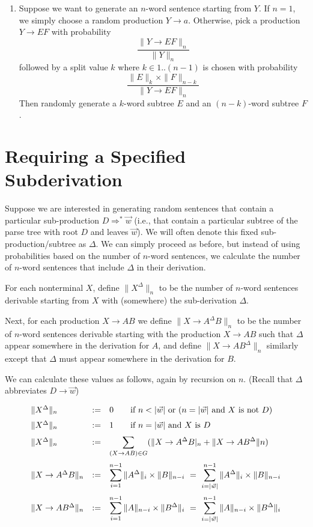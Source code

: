\documentclass[12pt]{article}
\begin{document}
\begin{enumerate}
    \item Suppose we want to generate an $n$-word sentence starting from $Y$.
    If $n = 1$, we simply choose a random production $Y \to a$. Otherwise,
    pick a production $Y\to EF$ with probability
    \[\frac{\|Y \to EF\|_n}{\|Y\|_n} \]
    followed by a split value $k$ where $k\in{1..(n-1)}$ is chosen with probability
    \[
      \frac{\|E\|_k\times\|F\|_{n{-}k}}{\|Y\to EF\|_n}
    \]
    Then randomly generate a $k$-word subtree $E$ and an $(n{-}k)$-word subtree $F$.
\end{enumerate}

\section{Requiring a Specified Subderivation}

Suppose we are interested in generating random sentences that contain a particular sub-production $D \Rightarrow^* \vec{w}$ (i.e., that contain a particular subtree of the parse tree with root $D$ and leaves $\vec{w}$). We will often denote this fixed sub-production/subtree as $\Delta$.
We can simply proceed as before, but instead of using probabilities based on  the number of $n$-word sentences, we calculate the number of $n$-word sentences that include $\Delta$ in their derivation.

For each nonterminal $X$, define $\|X^\Delta\|_n$ to be the number of $n$-word sentences derivable starting from $X$ with (somewhere) the sub-derivation $\Delta$.

Next, for each production $X\to AB$ we define $\|X\to A^\Delta B\|_n$ to be the number of $n$-word sentences derivable starting with the production $X\to AB$ such that $\Delta$ appear somewhere in the derivation for $A$, and define
$\|X\to AB^\Delta\|_n$ similarly except that $\Delta$ must appear somewhere in the derivation for $B$.

We can calculate these values as follows, again by recursion on $n$. (Recall that $\Delta$ abbreviates $D\to \vec{w}$)

\[
    \begin{array}{lcl}
    \|X^\Delta\|_n &:=&0 \qquad \mbox{if $n < |\vec{w}|$ or ($n = |\vec{w}|$ and $X$ is not $D$)}\\
    \noalign{\medskip}
    \|X^\Delta\|_n &:=& 1 \qquad \mbox{if $n = |\vec{w}|$ and $X$ is $D$}\\
    \noalign{\medskip}
    \|X^\Delta\|_n &:=& \displaystyle\sum_{(X{\to}AB)\in G} (\|X\to A^\Delta B|_n + \|X\to AB^\Delta\|n)\\
    \noalign{\medskip}
    \|X\to A^\Delta B\|_n & := & \displaystyle\sum_{i=1}^{n-1}\|A^\Delta\|_i\times\|B\|_{n-i} \ =\  \sum_{i=|\vec{w}|}^{n-1}\|A^\Delta\|_i\times\|B\|_{n-i}\\
    \noalign{\medskip}
    \|X\to AB^\Delta\|_n & := & \displaystyle\sum_{i=1}^{n-1}\|A\|_{n-i}\times\|B^\Delta\|_{i} \ = \ \displaystyle\sum_{i=|\vec{w}|}^{n-1}\|A\|_{n-i}\times\|B^\Delta\|_{i}\\
    \end{array}
\]
\end{document}
